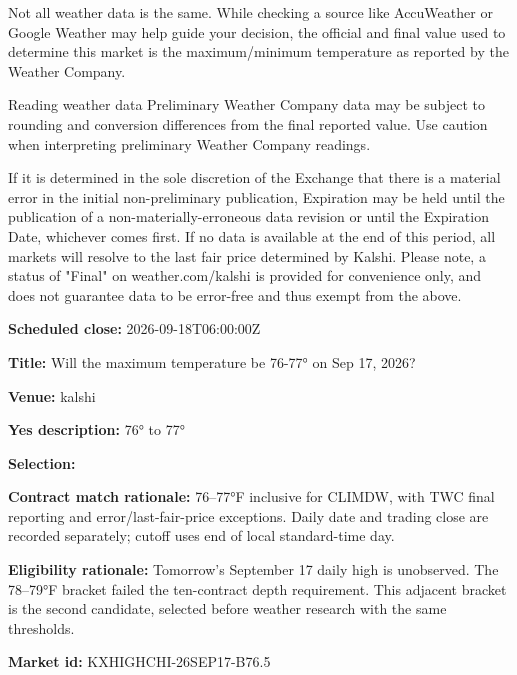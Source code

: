 \documentclass[11pt]{article}
\begin{document}
Not all weather data is the same. While checking a source like AccuWeather or Google Weather may help guide your decision, the official and final value used to determine this market is the maximum/minimum temperature as reported by the Weather Company.

Reading weather data
Preliminary Weather Company data may be subject to rounding and conversion differences from the final reported value.
Use caution when interpreting preliminary Weather Company readings.

If it is determined in the sole discretion of the Exchange that there is a material error in the initial non-preliminary publication, Expiration may be held until the publication of a non-materially-erroneous data revision or until the Expiration Date, whichever comes first. If no data is available at the end of this period, all markets will resolve to the last fair price determined by Kalshi. Please note, a status of "Final" on weather.com/kalshi is provided for convenience only, and does not guarantee data to be error-free and thus exempt from the above.

\par\noindent\textbf{Scheduled close:} 2026-09-18T06:00:00Z

\par\noindent\textbf{Title:} Will the maximum temperature be 76-77° on Sep 17, 2026?

\par\noindent\textbf{Venue:} kalshi

\par\noindent\textbf{Yes description:} 76° to 77°

\par\noindent\textbf{Selection:} \par \par\noindent\textbf{Contract match rationale:} 76–77°F inclusive for CLIMDW, with TWC final reporting and error/last-fair-price exceptions. Daily date and trading close are recorded separately; cutoff uses end of local standard-time day.

\par\noindent\textbf{Eligibility rationale:} Tomorrow’s September 17 daily high is unobserved. The 78–79°F bracket failed the ten-contract depth requirement. This adjacent bracket is the second candidate, selected before weather research with the same thresholds.

\par\noindent\textbf{Market id:} KXHIGHCHI-26SEP17-B76.5
\end{document}
